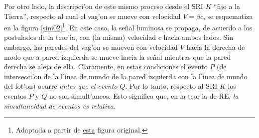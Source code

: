 Por otro lado, la descripci'on de este mismo proceso desde el SRI $K$ ``fijo a la Tierra'', respecto al cual el vag'on se mueve con velocidad $V=\beta c$, se esquematiza en la figura \ref{sim02}\footnote{Adaptada a partir de \href{http://commons.wikimedia.org/wiki/File:Traincar_Relativity2.svg}{esta} figura original.}. En este caso, la se\~nal luminosa se propaga, de acuerdo a los postulados de la teor'ia, con (la misma) velocidad $c$ hacia ambos lados. Sin embargo, las paredes del vag'on se mueven con velocidad $V$ hacia la derecha de modo que a pared izquierda se mueve hacia la se\~nal mientras que la pared derecha se aleja de ella. Claramente, en estas condiciones el evento $P$ (de intersecci'on de la l'inea de mundo de la pared izquierda con la l'inea de mundo del fot'on) ocurre \textit{antes que el evento} $Q$. Por lo tanto, respecto al SRI $K$ los eventos $P$ y $Q$ no son simult'aneos. Esto significa que, en la teor'ia de RE, \textit{la simultaneidad de eventos es relativa}.

